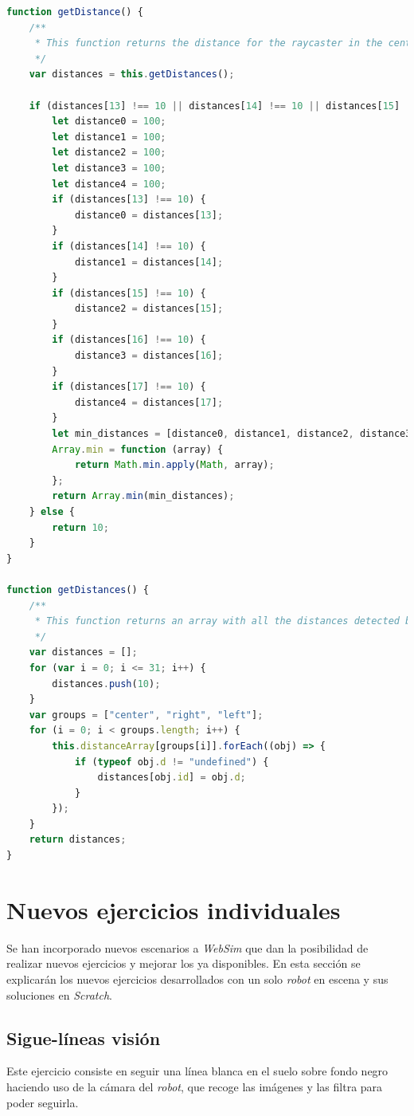  \begin{lstlisting}[language=javascript]
function getDistance() {
    /**
     * This function returns the distance for the raycaster in the center of the arc of rays.
     */
    var distances = this.getDistances();

    if (distances[13] !== 10 || distances[14] !== 10 || distances[15] !== 10 || distances[16] !== 10 || distances[17] !== 10) {
        let distance0 = 100;
        let distance1 = 100;
        let distance2 = 100;
        let distance3 = 100;
        let distance4 = 100;
        if (distances[13] !== 10) {
            distance0 = distances[13];
        }
        if (distances[14] !== 10) {
            distance1 = distances[14];
        }
        if (distances[15] !== 10) {
            distance2 = distances[15];
        }
        if (distances[16] !== 10) {
            distance3 = distances[16];
        }
        if (distances[17] !== 10) {
            distance4 = distances[17];
        }
        let min_distances = [distance0, distance1, distance2, distance3, distance4];
        Array.min = function (array) {
            return Math.min.apply(Math, array);
        };
        return Array.min(min_distances);
    } else {
        return 10;
    }
}

function getDistances() {
    /**
     * This function returns an array with all the distances detected by the rays.
     */
    var distances = [];
    for (var i = 0; i <= 31; i++) {
        distances.push(10);
    }
    var groups = ["center", "right", "left"];
    for (i = 0; i < groups.length; i++) {
        this.distanceArray[groups[i]].forEach((obj) => {
            if (typeof obj.d != "undefined") {
                distances[obj.id] = obj.d;
            }
        });
    }
    return distances;
}
\end{lstlisting}


\section{Nuevos ejercicios individuales}
\label{sec:escenarios}

Se han incorporado nuevos escenarios a \textit{WebSim} que dan la posibilidad de realizar nuevos ejercicios y mejorar los ya disponibles. En esta sección se explicarán los nuevos ejercicios desarrollados con un solo \textit{robot} en escena y sus soluciones en \textit{Scratch}.

\subsection{Sigue-líneas visión}
    Este ejercicio consiste en seguir una línea blanca en el suelo sobre fondo negro haciendo uso de la cámara del \textit{robot}, que recoge las imágenes y las filtra para poder seguirla.
    
